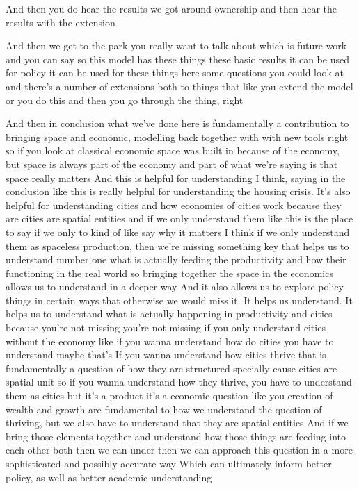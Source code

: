 And then you do hear the results we got around ownership and then hear the results with the extension

And then we get to the park you really want to talk about which is future work and you can say so this model has these things these basic results it can be used for policy it can be used for these things here some questions you could look at and there’s a number of extensions both to things that like you extend the model or you do this and then you go through the thing, right


And then in conclusion what we’ve done here is fundamentally a contribution to bringing space and economic, modelling back together with with new tools right so if you look at classical economic space was built in because of the economy, but space is always part of the economy and part of what we’re saying is that space really matters And this is helpful for understanding I think, saying in the conclusion like this is really helpful for understanding the housing crisis. It’s also helpful for understanding cities and how economies of cities work because they are cities are spatial entities and if we only understand them like this is the place to say if we only to kind of like say why it matters I think if we only understand them as spaceless production, then we’re missing something key that helps us to understand number one what is actually feeding the productivity and how their functioning in the real world so bringing together the space in the economics allows us to understand in a deeper way And it also allows us to explore policy things in certain ways that otherwise we would miss it. It helps us understand. It helps us to understand what is actually happening in productivity and cities because you’re not missing you’re not missing if you only understand cities without the economy like if you wanna understand how do cities you have to understand maybe that’s
If you wanna understand how cities thrive that is fundamentally a question of how they are structured specially cause cities are spatial unit so if you wanna understand how they thrive, you have to understand them as cities but it’s a product it’s a economic question like you creation of wealth and growth are fundamental to how we understand the question of thriving, but we also have to understand that they are spatial entities And if we bring those elements together and understand how those things are feeding into each other both then we can under then we can approach this question in a more sophisticated and possibly accurate way
Which can ultimately inform better policy, as well as better academic understanding




